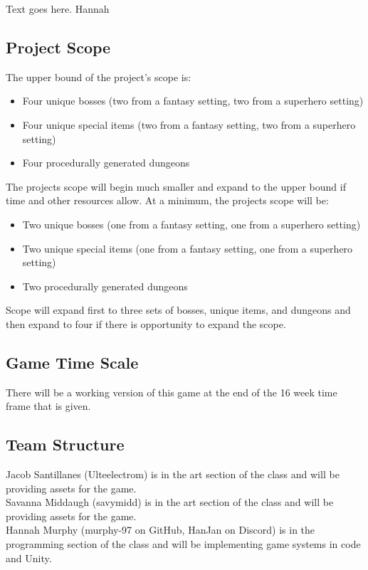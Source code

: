 \documentclass[titlepage]{article}
\begin{document}
Text goes here. Hannah

\subsection*{Project Scope}
The upper bound of the project's scope is:
\begin{itemize}
    \item Four unique bosses (two from a fantasy setting, two from a superhero setting)
    \item Four unique special items (two from a fantasy setting, two from a superhero setting)
    \item Four procedurally generated dungeons
\end{itemize}

The projects scope will begin much smaller and expand to the upper bound if time
and other resources allow. At a minimum, the projects scope will be:
\begin{itemize}
    \item Two unique bosses (one from a fantasy setting, one from a superhero setting)
    \item Two unique special items (one from a fantasy setting, one from a superhero setting)
    \item Two procedurally generated dungeons
\end{itemize}

Scope will expand first to three sets of bosses, unique items, and dungeons and
then expand to four if there is opportunity to expand the scope.

\subsection*{Game Time Scale}
There will be a working version of this game at the end of the 16 week time 
frame that is given.

\subsection*{Team Structure}
Jacob Santillanes (Ulteelectrom) is in the art section of the class and will be 
providing assets for the game. \\

Savanna Middaugh (savymidd) is in the art section of the class and will be 
providing assets for the game. \\

Hannah Murphy (murphy-97 on GitHub, HanJan on Discord) is in the programming
section of the class and will be implementing game systems in code and Unity.
\end{document}
